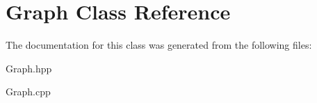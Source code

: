 \hypertarget{classGraph}{}\section{Graph Class Reference}
\label{classGraph}


The documentation for this class was generated from the following files\+:\begin{DoxyCompactItemize}
\item 
Graph.\+hpp\item 
Graph.\+cpp\end{DoxyCompactItemize}
